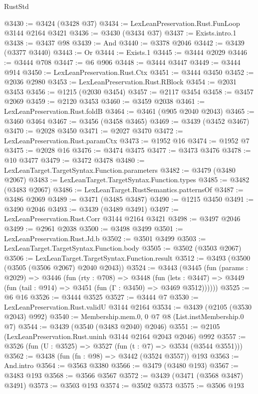 \begin{lexlean}{RustStd}
\begin{coremodule}
@3430 := @3424 (@3428 @37)
@3434 := LexLeanPreservation.Rust.FunLoop @3144 @2164 @3421
@3436 := @3430 (@3434 @37)
@3437 := Exists.intro.{1}
@3438 := @3437 @98
@3439 := And
@3440 := @3378 @2046
@3442 := @3439 (@3377 @3440)
@3443 := Or
@3444 := Exists.{1}
@3445 := @3444 @2029
@3446 := @3444 @708
@3447 := @6 @906
@3448 := @3444 @3447
@3449 := @3444 @914
@3450 := LexLeanPreservation.Rust.Ctx
@3451 := @3444 @3450
@3452 := @2036 @2980
@3453 := LexLeanPreservation.Rust.RBlock
@3454 := @2031 @3453
@3456 := @1215 (@2030 @3454)
@3457 := @2117 @3454
@3458 := @3457 @2069
@3459 := @2120 @3453
@3460 := @3459 @2038
@3461 := LexLeanPreservation.Rust.foldB
@3464 := @3461 (@905 @2040 @2043)
@3465 := @3460 @3464
@3467 := @3456 (@3458 @3465)
@3469 := @3439 (@3452 @3467)
@3470 := @2028 @3450
@3471 := @2027 @3470
@3472 := LexLeanPreservation.Rust.paramCtx
@3473 := @1952 @16
@3474 := @1952 @7
@3475 := @2028 @16
@3476 := @3474 @3475
@3477 := @3473 @3476
@3478 := @10 @3477
@3479 := @3472 @3478
@3480 := LexLeanTarget.TargetSyntax.Function.parameters
@3482 := @3479 (@3480 @2067)
@3483 := LexLeanTarget.TargetSyntax.Function.types
@3485 := @3482 (@3483 @2067)
@3486 := LexLeanTarget.RustSemantics.patternsOf
@3487 := @3486 @2069
@3489 := @3471 (@3485 @3487)
@3490 := @1215 @3450
@3491 := @3490 @2046
@3493 := @3439 (@3489 @3491)
@3497 := LexLeanPreservation.Rust.Corr @3144 @2164 @3421
@3498 := @3497 @2046
@3499 := @2961 @2038
@3500 := @3498 @3499
@3501 := LexLeanPreservation.Rust.Jd.b
@3502 := @3501 @3499
@3503 := LexLeanTarget.TargetSyntax.Function.body
@3505 := @3502 (@3503 @2067)
@3506 := LexLeanTarget.TargetSyntax.Function.result
@3512 := @3493 (@3500 (@3505 (@3506 @2067) @2040 @2043))
@3524 := @3443
    (@3445
      (fun (params : @2029) =>
      @3446
        (fun (rty : @708) =>
        @3448
          (fun (lets : @3447) =>
          @3449 (fun (tail : @914) => @3451 (fun (Γ : @3450) => @3469 @3512))))))
@3525 := @6 @16
@3526 := @3444 @3525
@3527 := @3444 @7
@3530 := LexLeanPreservation.Rust.validU @3144 @2164
@3534 := @3439 (@2105 (@3530 @2043) @992)
@3540 := Membership.mem.{0, 0} @7 @8 (List.instMembership.{0} @7)
@3544 := @3439 (@3540 (@3483 @2040) @2046)
@3551 := @2105 (LexLeanPreservation.Rust.uninh @3144 @2164 @2043 @2046) @992
@3557 := @3526 (fun (U : @3525) => @3527 (fun (t : @7) => @3534 (@3544 @3551)))
@3562 := @3438 (fun (fn : @98) => @3442 (@3524 @3557)) @193
@3563 := And.intro
@3564 := @3563 @3380
@3566 := @3479 (@3480 @193)
@3567 := @3483 @193
@3568 := @3566 @3567
@3572 := @3439 (@3471 (@3568 @3487) @3491)
@3573 := @3503 @193
@3574 := @3502 @3573
@3575 := @3506 @193

\end{coremodule}
\end{lexlean}

